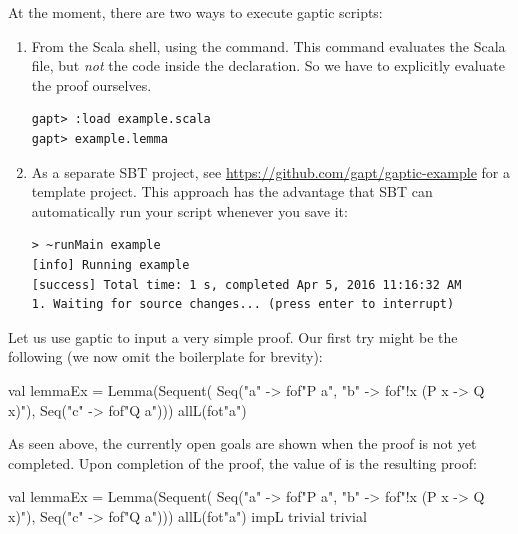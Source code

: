 \documentclass[a4paper,11pt]{book}
\newcommand{\cli}[1]{{\ttfamily {#1}}}
\begin{document}
At the moment, there are two ways to execute gaptic scripts:
\begin{enumerate}

  \item From the Scala shell, using the \cli{:load} command.  This command
    evaluates the Scala file, but \emph{not} the code inside the \cli{object}
    declaration.  So we have to explicitly evaluate the proof ourselves.
\begin{lstlisting}
gapt> :load example.scala
gapt> example.lemma
\end{lstlisting}

  \item As a separate SBT project, see
    \url{https://github.com/gapt/gaptic-example} for a template project.  This
approach has the advantage that SBT can automatically run your script whenever
you save it:
\begin{lstlisting}
> ~runMain example
[info] Running example 
[success] Total time: 1 s, completed Apr 5, 2016 11:16:32 AM
1. Waiting for source changes... (press enter to interrupt)
\end{lstlisting}

\end{enumerate}

Let us use gaptic to input a very simple proof.  Our first try might be the
following (we now omit the boilerplate for brevity):
\begin{tacticslisting}
val lemmaEx =
  Lemma(Sequent(
      Seq("a" -> fof"P a", "b" -> fof"!x (P x -> Q x)"),
      Seq("c" -> fof"Q a"))) {
    allL(fot"a")
  }
\end{tacticslisting}

As seen above, the currently open goals are shown when the proof is not yet
completed. Upon completion of the proof, the value of \cli{lemmaEx} is the
resulting proof:
\begin{tacticslisting}
val lemmaEx =
  Lemma(Sequent(
      Seq("a" -> fof"P a", "b" -> fof"!x (P x -> Q x)"),
      Seq("c" -> fof"Q a"))) {
    allL(fot"a")
    impL
    trivial
    trivial
  }
\end{tacticslisting}
\begin{tacticsoutput}
\end{tacticsoutput}
\end{document}
